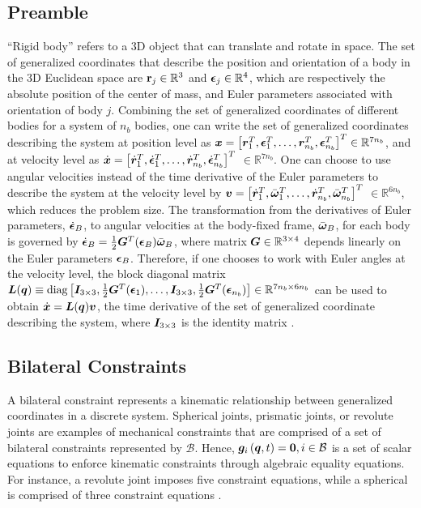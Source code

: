 \subsection*{Preamble}
``Rigid body'' refers to a 3D object that can translate and rotate in space. The set of generalized coordinates that describe the position and orientation of a body in the 3D Euclidean space are $\mathbf{r}_j\in \mathbb{R}^3$ and $\boldsymbol{\epsilon}_j\in \mathbb{R}^4$, which are respectively the absolute position of the center of mass, and Euler parameters associated with orientation of body $j$. Combining the set of generalized coordinates of different bodies for a system of $n_b$ bodies, one can write the set of generalized coordinates describing the system at position level as $\boldsymbol{x} = \left[ \boldsymbol{r}_1^T, \boldsymbol{\epsilon}_1^T,\ldots,\boldsymbol{r}_{n_b}^T, \boldsymbol{\epsilon}_{n_b}^T \right]^T \in \mathbb{R}^{7 n_b} $, and at velocity level as  $\dot{\boldsymbol{x}} = \left[ \dot{\boldsymbol{r}}_1^T, \dot{\boldsymbol{\epsilon}}_1^T,\ldots, \dot{\boldsymbol{r}}_{n_b}^T, 
\dot{\boldsymbol{\epsilon}}_{n_b}^T \right]^T$ $\in \mathbb{R}^{7 n_b}$. One can choose to use angular velocities instead of the time derivative of the Euler parameters to describe the system at the velocity level by  $\boldsymbol{v} = \left[ \dot{\boldsymbol{r}}_1^T, \bar{\boldsymbol{\omega}}_1^T,\ldots, \dot{\boldsymbol{r}}_{n_b}^T, 
\bar{\boldsymbol{\omega}}_{n_b}^T \right]^T$ $\in \mathbb{R}^{6 n_b}$, which reduces the problem size. The transformation from the derivatives of Euler parameters, ${\dot{\boldsymbol{\epsilon}}}_{B}$, to angular velocities at the body-fixed frame, ${\bar{\boldsymbol{\omega}}}_{B}$, for each body is governed by ${\dot{\boldsymbol{\epsilon}}}_{B}=\frac{1}{2} {\boldsymbol{G}}^T(\boldsymbol{\epsilon}_{B}) {\bar{\boldsymbol{\omega}}}_{B} $, where matrix ${\boldsymbol{G}}\in {\mathbb{R}}^{3 \times 4}$ depends linearly on the Euler parameters ${\boldsymbol{\epsilon}}_{B}$. Therefore, if one chooses to work with Euler angles at the velocity level, the block diagonal matrix  ${\boldsymbol{L}}(\boldsymbol{q}) \equiv \mbox{diag} \left[{{\boldsymbol{I}}}_{3 \times 3}, \frac{1}{2} {\boldsymbol{G}}^T(\boldsymbol{\epsilon}_{1}),\ldots,{\boldsymbol{I}}_{3 \times 3}, \frac{1}{2} {\boldsymbol{G}}^T(\boldsymbol{\epsilon}_{n_b})\right] \in {\mathbb{R}}^{7 n_b \times 6 n_b}$ can be used to obtain ${\dot{\boldsymbol{x}}} = {\boldsymbol{L}}({\boldsymbol{q}}) \boldsymbol{v}$, the time derivative of the set of generalized coordinate describing the system, where ${\boldsymbol{I}}_{3 \times 3}$ is the identity matrix \cite{Haug89}. 
\subsection{Bilateral Constraints}
A bilateral constraint represents a kinematic relationship between generalized coordinates in a discrete system. Spherical joints, prismatic joints, or revolute joints are examples of mechanical constraints that are comprised of a set of bilateral constraints represented by  $\mathcal{B}$. Hence, $\boldsymbol{g}_i\left(\boldsymbol{q},t\right)=\boldsymbol{0},i\in \mathcal{B}$ is a set of scalar equations to enforce kinematic constraints through algebraic equality equations. For instance, a revolute joint imposes five constraint equations, while a spherical is comprised of three constraint equations \cite{Haug89}.

